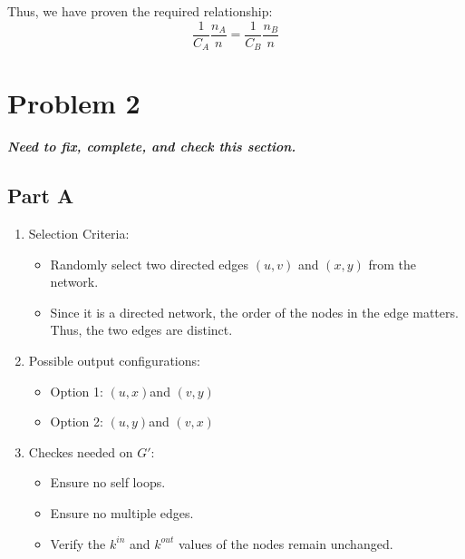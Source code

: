 \documentclass[12pt]{article}
\begin{document}
Thus, we have proven the required relationship:
\[
\frac{1}{C_A} \frac{n_A}{n} = \frac{1}{C_B} \frac{n_B}{n}
\]

\section*{Problem 2}    

\textbf{\textit{Need to fix, complete, and check this section.}}\\
\subsection*{Part A}
\begin{enumerate}
    \item Selection Criteria:
    \begin{itemize}
        \item Randomly select two directed edges \( (u,v) \) and \( (x,y) \) from the network.
        \item Since it is a directed network, the order of the nodes in the edge matters. Thus, the two edges are distinct.
    \end{itemize}
    \item Possible output configurations:
    \begin{itemize}
        \item Option 1: \( (u, x)\)and \( (v, y) \)
        \item Option 2: \( (u, y)\)and \( (v, x) \)
    \end{itemize}
    \item Checkes needed on $G'$:
    \begin{itemize}
        \item Ensure no self loops.
        \item Ensure no multiple edges.
        \item Verify the $k^{in}$ and $k^{out}$ values of the nodes remain unchanged.
    \end{itemize}
\end{enumerate}
\end{document}
